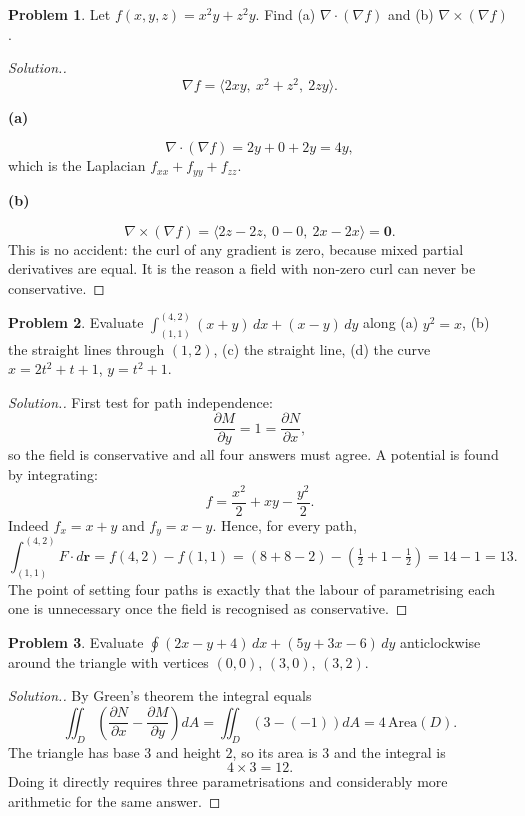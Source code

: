 \documentclass[11pt,a4paper]{article}
\theoremstyle{definition}
\newtheorem{problemx}{Problem}[subsection]
\newenvironment{problem}{\begin{problemx}}{\end{problemx}}
\newenvironment{solution}
  {\renewcommand{\qedsymbol}{}\begin{proof}[\textit{Solution}.]}
  {\end{proof}}
\newcommand{\subhead}[1]{%
  \par\medskip\noindent\textbf{#1}\par\nobreak\smallskip}
\begin{document}
\begin{problem}
Let $f(x,y,z) = x^2y+z^2y$. Find
(a) $\nabla\cdot(\nabla f)$ and (b) $\nabla\times(\nabla f)$.
\end{problem}
\begin{solution}
\[\nabla f = \langle 2xy,\ x^2+z^2,\ 2zy\rangle .\]

\subhead{(a)}
\[\nabla\cdot(\nabla f) = 2y + 0 + 2y = 4y ,\]
which is the Laplacian $f_{xx}+f_{yy}+f_{zz}$.

\subhead{(b)}
\[\nabla\times(\nabla f)
= \langle 2z-2z,\ 0-0,\ 2x-2x\rangle = \textbf{0}.\]
This is no accident: the curl of any gradient is zero, because mixed partial
derivatives are equal. It is the reason a field with non-zero curl can never be
conservative.
\end{solution}

\begin{problem}
Evaluate $\displaystyle{\int_{(1,1)}^{(4,2)}(x+y)\,dx + (x-y)\,dy}$ along
(a) $y^2 = x$, (b) the straight lines through $(1,2)$, (c) the straight line,
(d) the curve $x = 2t^2+t+1$, $y = t^2+1$.
\end{problem}
\begin{solution}
First test for path independence:
\[\frac{\partial M}{\partial y} = 1 = \frac{\partial N}{\partial x},\]
so the field is conservative and all four answers must agree. A potential is
found by integrating:
\[f = \frac{x^2}{2} + xy - \frac{y^2}{2}.\]
Indeed $f_x = x+y$ and $f_y = x-y$. Hence, for every path,
\[\int_{(1,1)}^{(4,2)} F\cdot d\mathbf r = f(4,2) - f(1,1)
= (8+8-2) - (\tfrac12+1-\tfrac12) = 14 - 1 = 13 .\]
The point of setting four paths is exactly that the labour of parametrising each
one is unnecessary once the field is recognised as conservative.
\end{solution}

\begin{problem}
Evaluate $\displaystyle{\oint(2x-y+4)\,dx + (5y+3x-6)\,dy}$ anticlockwise
around the triangle with vertices $(0,0)$, $(3,0)$, $(3,2)$.
\end{problem}
\begin{solution}
By Green's theorem the integral equals
\[\iint_D\left(\frac{\partial N}{\partial x}-\frac{\partial M}{\partial y}\right)dA
= \iint_D(3-(-1))dA = 4\,\text{Area}(D).\]
The triangle has base $3$ and height $2$, so its area is $3$ and the integral is
\[4\times 3 = 12 .\]
Doing it directly requires three parametrisations and considerably more
arithmetic for the same answer.
\end{solution}
\end{document}
